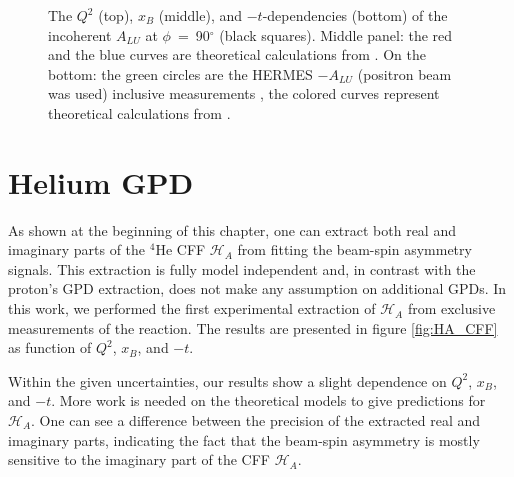 \begin{figure}[tpb]
\caption{The $Q^{2}$ (top), $x_{B}$ (middle), and $-t$-dependencies (bottom) of 
   the incoherent $A_{LU}$ at $\phi$~=~90$^{\circ}$ (black squares). Middle 
   panel: the red and the blue curves are theoretical calculations from 
   \cite{simonetta_2}. On the bottom: the green circles are the HERMES 
$-A_{LU}$ (positron beam was used) inclusive measurements \cite{HERMES_BSA}, 
the colored curves represent theoretical calculations from \cite{simonetta_2}.  
} \label{fig:incoh_Q2_xB_t_ALU}
\end{figure}


\section{Helium GPD}
As shown at the beginning of this chapter, one can extract both real and
imaginary parts of the 
$^4$He CFF $\mathcal{H}_A$ from fitting the beam-spin asymmetry signals. This extraction
is fully model independent and, in contrast with the proton's GPD extraction, does not
make any assumption on additional GPDs. In this 
work, we performed the first experimental extraction of $\mathcal{H}_A$ from 
exclusive measurements of the reaction. The results are presented in figure 
\ref{fig:HA_CFF} as function of $Q^{2}$, $x_B$, and $-t$.

Within the given uncertainties, our results show a slight dependence on 
$Q^{2}$, $x_B$, and $-t$.  More work is needed on the theoretical models to 
give predictions for $\mathcal{H}_A$.  One can see a difference between the 
precision of the extracted real and imaginary parts, indicating the fact that 
the beam-spin asymmetry is mostly sensitive to the imaginary part of the  CFF 
$\mathcal{H}_A$.

